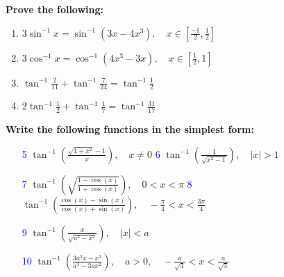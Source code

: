 \documentclass[a4paper,12pt]{article}                                                                       \usepackage{amsmath, amssymb, xcolor, tcolorbox}                                                            \usepackage{geometry}
\newcommand{\exercisebox}{
    \begin{center}
        \begin{tcolorbox}[colback=cyan!20, colframe=blue, sharp corners=south, boxrule=0.8pt, width=0.4\textwidth]
            \centering {\Large \textbf{\textcolor{blue}{EXERCISE 2.2}}}
        \end{tcolorbox}
    \end{center}
}
\begin{document}
                                                                                                                                                               \exercisebox
\textbf{Prove the following:}                                                                                                                                                                       \begin{enumerate}
    \renewcommand{\labelenumi}{\textcolor{blue}{\theenumi}.} %
    \item $3\sin^{-1} x = \sin^{-1} (3x-4x^{3}), \quad x \in \left[ \frac{-1}{2}, \frac{1}{2} \right]$          \item $3\cos^{-1} x = \cos^{-1}(4x^3-3x), \quad x \in \left[ \frac{1}{2}, 1 \right]$
    \item $\tan^{-1} \frac{2}{11} + \tan^{-1} \frac{7}{24} = \tan^{-1} \frac{1}{2}$
    \item $2\tan^{-1} \frac{1}{2} + \tan^{-1} \frac{1}{7} = \tan^{-1} \frac{31}{17}$
\end{enumerate}

\textbf{Write the following functions in the simplest form:} 

\begin{enumerate}
    \item[\textcolor{blue}{5}] $\tan^{-1}\left( \frac{\sqrt{1 + x^2} - 1}{x} \right),\quad x\neq 0$
    \hspace{1cm} %
    \textcolor{blue}{6} $\tan^{-1}\left( \frac{1}{\sqrt{x^2 - 1}} \right),\quad|x|>1$
\end{enumerate}                                                                                             \begin{enumerate}
    \item[\textcolor{blue}{7}] $\tan^{-1} \left( \sqrt{\frac{1 - \cos(x)}{1 + \cos(x)}} \right), \quad 0 < x < \pi$
    \hspace{1cm}
    \textcolor{blue}{8} $\tan^{-1} \left( \frac{\cos(x) - \sin(x)}{\cos(x) + \sin(x)} \right), \quad -\frac{\pi}{4} < x < \frac{3\pi}{4}$
\end{enumerate}

\begin{enumerate}
    \item[\textcolor{blue}{9}] $\tan^{-1}\left( \frac{x}{\sqrt{a^2 - x^2}} \right), \quad |x| < a$
    \item[\textcolor{blue}{10}] $\tan^{-1}\left( \frac{3a^2x - x^3}{a^3 - 3ax^2} \right), \quad a > 0, \quad -\frac{a}{\sqrt{3}} < x < \frac{a}{\sqrt{3}}$
\end{enumerate}
\end{document}
